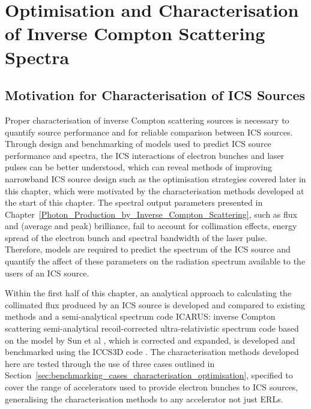 \documentclass[../main.tex]{subfiles}
\begin{document}
\chapter{Optimisation and Characterisation of Inverse Compton Scattering Spectra}
\label{Optimisation_and_Characterisation_of_Inverse_Compton Scattering_Spectra} %

\section{Motivation for Characterisation of ICS Sources}

Proper characterisation of inverse Compton scattering sources is necessary to quantify source performance and for reliable comparison between ICS sources. Through design and benchmarking of models used to predict ICS source performance and spectra, the ICS interactions of electron bunches and laser pulses can be better understood, which can reveal methods of improving narrowband ICS source design such as the optimisation strategies covered later in this chapter, which were motivated by the characterisation methods developed at the start of this chapter. The spectral output parameters presented in Chapter~\ref{Photon_Production_by_Inverse_Compton_Scattering}, such as flux and (average and peak) brilliance, fail to account for collimation effects, energy spread of the electron bunch and spectral bandwidth of the laser pulse. Therefore, models are required to predict the spectrum of the ICS source and quantify the affect of these parameters on the radiation spectrum available to the users of an ICS source. 

Within the first half of this chapter, an analytical approach to calculating the collimated flux produced by an ICS source is developed and compared to existing methods \cite{curatolo2017analytical} and a semi-analytical spectrum code \textsc{ICARUS}: inverse Compton scattering semi-analytical recoil-corrected ultra-relativistic spectrum code based on the model by Sun et al \cite{sun2009characterizations,sun2011theoretical}, which is corrected and expanded, is developed and benchmarked using the \textsc{ICCS3D} code \cite{krafft2016laser,ranjan2018simulation}. The characterisation methods developed here are tested through the use of three cases outlined in Section~\ref{sec:benchmarking_cases_characterisation_optimisation}, specified to cover the range of accelerators used to provide electron bunches to ICS sources, generalising the characterisation methods to any accelerator not just ERLs.
\end{document}
